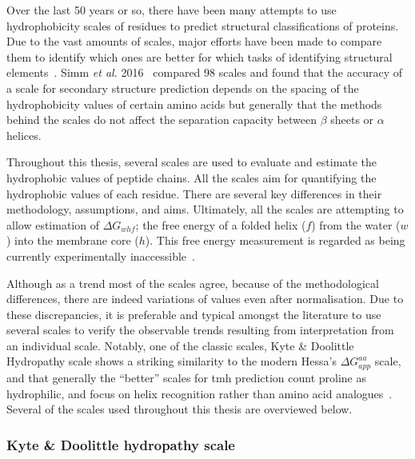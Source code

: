 Over the last 50 years or so, there have been many attempts to use hydrophobicity scales of residues to predict structural classifications of proteins.
Due to the vast amounts of scales, major efforts have been made to compare them to identify which ones are better for which tasks of identifying structural elements~\cite{Simm2016, Peters2014}.
Simm \textit{ et al.} 2016~\cite{Simm2016} compared 98 scales and found that the accuracy of a scale for secondary structure prediction depends on the spacing of the hydrophobicity values of certain amino acids but generally that the methods behind the scales do not affect the separation capacity between $ \beta $ sheets or $ \alpha $ helices.

Throughout this thesis, several scales are used to evaluate and estimate the hydrophobic values of peptide chains.
All the scales aim for quantifying the hydrophobic values of each residue.
There are several key differences in their methodology, assumptions, and aims.
Ultimately, all the scales are attempting to allow estimation of ${\Delta G}_{whf}$; the free energy of a folded helix ($ f $) from the water ($w$) into the membrane core ($h$).
This free energy measurement is regarded as being currently experimentally inaccessible~\cite{Cymer2015}.

Although as a trend most of the scales agree, because of the methodological differences, there are indeed variations of values even after normalisation.
Due to these discrepancies, it is preferable and typical amongst the literature to use several scales to verify the observable trends resulting from interpretation from an individual scale.
Notably, one of the classic scales, Kyte \& Doolittle Hydropathy scale shows a striking similarity to the modern Hessa's ${\Delta G}_{app}^{aa}$ scale, and that generally the ``better'' scales for \gls{tmh} prediction count proline as hydrophilic, and focus on helix recognition rather than amino acid analogues~\cite{Peters2014}.
Several of the scales used throughout this thesis are overviewed below.

\subsubsection{Kyte \& Doolittle hydropathy scale}

